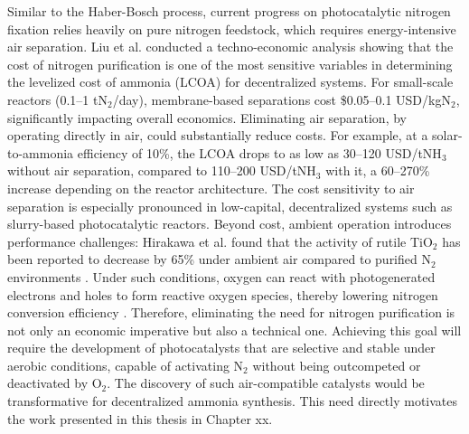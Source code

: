 Similar to the Haber-Bosch process, current progress on photocatalytic nitrogen fixation relies heavily on pure nitrogen feedstock, which requires energy-intensive air separation. Liu et al. conducted a techno-economic analysis showing that the cost of nitrogen purification is one of the most sensitive variables in determining the levelized cost of ammonia (LCOA) for decentralized systems. For small-scale reactors (0.1–1 tN$_2$/day), membrane-based separations cost \$0.05–0.1 USD/kgN$_2$, significantly impacting overall economics. Eliminating air separation, by operating directly in air, could substantially reduce costs. For example, at a solar-to-ammonia efficiency of 10\%, the LCOA drops to as low as 30–120 USD/tNH$_3$ without air separation, compared to 110–200 USD/tNH$_3$ with it, a 60–270\% increase depending on the reactor architecture. The cost sensitivity to air separation is especially pronounced in low-capital, decentralized systems such as slurry-based photocatalytic reactors. Beyond cost, ambient operation introduces performance challenges: Hirakawa et al. found that the activity of rutile TiO$_2$ has been reported to decrease by 65\% under ambient air compared to purified N$_2$ environments \cite{Hirakawa_2017}. Under such conditions, oxygen can react with photogenerated electrons and holes to form reactive oxygen species, thereby lowering nitrogen conversion efficiency \cite{Ye2017Ni2PLight, Huang2020TowardLigands, comer2018role}. Therefore, eliminating the need for nitrogen purification is not only an economic imperative but also a technical one. Achieving this goal will require the development of photocatalysts that are selective and stable under aerobic conditions, capable of activating N$_2$ without being outcompeted or deactivated by O$_2$. The discovery of such air-compatible catalysts would be transformative for decentralized ammonia synthesis. This need directly motivates the work presented in this thesis in Chapter xx. 


